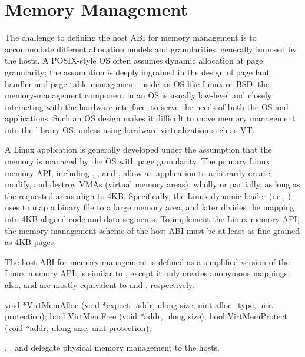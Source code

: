 \section{Memory Management}
\label{sec:abi:memory}


The challenge to defining the host ABI for memory management
is to accommodate different allocation models and granularities, generally imposed by the hosts.
A POSIX-style OS often assumes dynamic allocation at page granularity;
the assumption is deeply ingrained in the design of page fault handler and page table management
inside an OS like Linux or BSD;
the memory-management component in an OS
is usually low-level and closely interacting with the hardware interface,
to serve the needs of both the OS and applications.
Such an OS design makes it difficult to move memory management
into the library OS, unless using hardware virtualization such as VT.



A Linux application 
is generally developed under the assumption that the memory is managed by the OS
with page granularity.
The primary Linux memory API,
including , , and ,
allow an application
to arbitrarily create, modify, and destroy VMAs (virtual memory areas),
wholly or partially,
as long as the requested areas align to
4KB.
Specifically, the Linux dynamic loader (i.e., ) %
uses  to map a binary file to a large memory area,
and later divides the mapping into 4KB-aligned code and data segments.
To implement the Linux memory API,
the memory management scheme of the host ABI
must be at least as fine-grained as 4KB pages.


The host ABI for memory management is defined as a simplified version of the Linux memory API:
 is similar to , except it only creates anonymous mappings;
also,  and 
are mostly equivalent to
 and , respectively.


\begin{paldef}
void *VirtMemAlloc   (void *expect_addr, ulong size,
                      uint alloc_type, uint protection);
bool  VirtMemFree    (void *addr, ulong size);
bool  VirtMemProtect (void *addr, ulong size,
                      uint protection);
\end{paldef}


, , and 
delegate physical memory management to the hosts.




